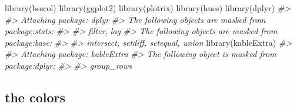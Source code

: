 \documentclass[
]{article}
\newenvironment{Shaded}{\begin{snugshade}}{\end{snugshade}}
\newcommand{\AttributeTok}[1]{\textcolor[rgb]{0.77,0.63,0.00}{#1}}
\newcommand{\CommentTok}[1]{\textcolor[rgb]{0.56,0.35,0.01}{\textit{#1}}}
\newcommand{\FunctionTok}[1]{\textcolor[rgb]{0.00,0.00,0.00}{#1}}
\newcommand{\NormalTok}[1]{#1}
\newcommand{\OtherTok}[1]{\textcolor[rgb]{0.56,0.35,0.01}{#1}}
\newcommand{\SpecialCharTok}[1]{\textcolor[rgb]{0.00,0.00,0.00}{#1}}
\newcommand{\StringTok}[1]{\textcolor[rgb]{0.31,0.60,0.02}{#1}}
\begin{document}
\begin{Shaded}
\begin{Highlighting}[]
\FunctionTok{library}\NormalTok{(bsscol)}
\FunctionTok{library}\NormalTok{(ggplot2)}
\FunctionTok{library}\NormalTok{(plotrix)}
\FunctionTok{library}\NormalTok{(hues)}
\FunctionTok{library}\NormalTok{(dplyr)}
\CommentTok{\#\textgreater{} }
\CommentTok{\#\textgreater{} Attaching package: \textquotesingle{}dplyr\textquotesingle{}}
\CommentTok{\#\textgreater{} The following objects are masked from \textquotesingle{}package:stats\textquotesingle{}:}
\CommentTok{\#\textgreater{} }
\CommentTok{\#\textgreater{}     filter, lag}
\CommentTok{\#\textgreater{} The following objects are masked from \textquotesingle{}package:base\textquotesingle{}:}
\CommentTok{\#\textgreater{} }
\CommentTok{\#\textgreater{}     intersect, setdiff, setequal, union}
\FunctionTok{library}\NormalTok{(kableExtra)}
\CommentTok{\#\textgreater{} }
\CommentTok{\#\textgreater{} Attaching package: \textquotesingle{}kableExtra\textquotesingle{}}
\CommentTok{\#\textgreater{} The following object is masked from \textquotesingle{}package:dplyr\textquotesingle{}:}
\CommentTok{\#\textgreater{} }
\CommentTok{\#\textgreater{}     group\_rows}
\end{Highlighting}
\end{Shaded}

\hypertarget{the-colors}{%
\subsection{the colors}\label{the-colors}}

\begin{Shaded}
\end{Shaded}
\end{document}
